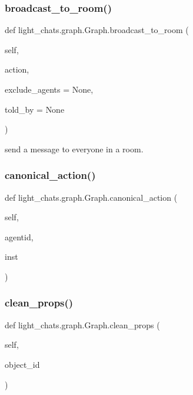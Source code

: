 \subsubsection{\texorpdfstring{broadcast\+\_\+to\+\_\+room()}{broadcast\_to\_room()}}
{\footnotesize\ttfamily def light\+\_\+chats.\+graph.\+Graph.\+broadcast\+\_\+to\+\_\+room (\begin{DoxyParamCaption}\item[{}]{self,  }\item[{}]{action,  }\item[{}]{exclude\+\_\+agents = {\ttfamily None},  }\item[{}]{told\+\_\+by = {\ttfamily None} }\end{DoxyParamCaption})}

\begin{DoxyVerb}send a message to everyone in a room.
\end{DoxyVerb}
 \mbox{\label{classlight__chats_1_1graph_1_1Graph_af644853db532d4cfa276a884f04c8544}} 
\subsubsection{\texorpdfstring{canonical\+\_\+action()}{canonical\_action()}}
{\footnotesize\ttfamily def light\+\_\+chats.\+graph.\+Graph.\+canonical\+\_\+action (\begin{DoxyParamCaption}\item[{}]{self,  }\item[{}]{agentid,  }\item[{}]{inst }\end{DoxyParamCaption})}

\mbox{\label{classlight__chats_1_1graph_1_1Graph_aa28ea4b9a270d74783f277f04170d669}} 
\subsubsection{\texorpdfstring{clean\+\_\+props()}{clean\_props()}}
{\footnotesize\ttfamily def light\+\_\+chats.\+graph.\+Graph.\+clean\+\_\+props (\begin{DoxyParamCaption}\item[{}]{self,  }\item[{}]{object\+\_\+id }\end{DoxyParamCaption})}


